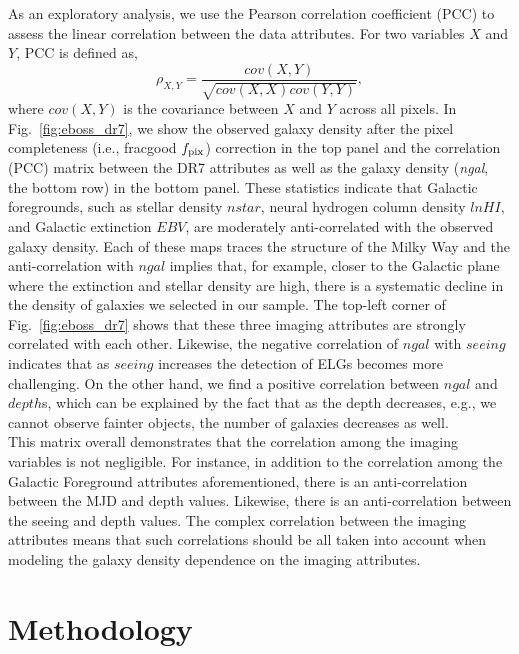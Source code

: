 \documentclass[fleqn, usenatbib]{mnras}
\newcommand{\lnHI}{$lnHI$}
\begin{document}
As an exploratory analysis, we use the Pearson correlation coefficient (PCC) to assess the linear correlation between the data attributes. For two variables $X$ and $Y$, PCC is defined as,
\begin{equation}\label{eq:pcc}
\rho_{X, Y} = \frac{cov(X, Y)}{\sqrt{cov(X,X)cov(Y,Y)}},
\end{equation}
where $cov(X,Y)$ is the covariance between $X$ and $Y$ across all pixels. In Fig.~\ref{fig:eboss_dr7}, we show the observed galaxy density after the pixel completeness (i.e., fracgood $f_{\rm pix}$) correction in the top panel and the correlation (PCC) matrix between the DR7 attributes as well as the galaxy density (\textit{ngal}, the bottom row) in the bottom panel. These statistics indicate that Galactic foregrounds, such as stellar density $nstar$, neural hydrogen column density \lnHI, and Galactic extinction $EBV$, are moderately anti-correlated with the observed galaxy density. Each of these maps traces the structure of the Milky Way and the anti-correlation with $ngal$ implies that, for example, closer to the Galactic plane where the extinction and stellar density are high, there is a systematic decline in the density of galaxies we selected in our sample. The top-left corner of Fig.~\ref{fig:eboss_dr7} shows that these three imaging attributes are strongly correlated with each other. Likewise, the negative correlation of $ngal$ with $seeing$ indicates that as $seeing$ increases the detection of ELGs becomes more challenging. On the other hand, we find a positive correlation between $ngal$ and $depth$s, which can be explained by the fact that as the depth decreases, e.g., we cannot observe fainter objects, the number of galaxies decreases as well.\\

This matrix overall demonstrates that the correlation among the imaging variables is not negligible. For instance, in addition to the correlation among the Galactic Foreground attributes aforementioned, there is an anti-correlation between the MJD and depth values. Likewise, there is an anti-correlation between the seeing and depth values. The complex correlation between the imaging attributes means that such correlations should be all taken into account when modeling the galaxy density dependence on the imaging attributes.

\section{Methodology}\label{sec:method}
\end{document}

